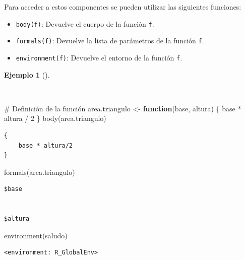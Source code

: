 \documentclass[
  spanish,
  a4paper,
]{scrreport}
\newenvironment{Shaded}{\begin{snugshade}}{\end{snugshade}}
\newcommand{\CommentTok}[1]{\textcolor[rgb]{0.37,0.37,0.37}{#1}}
\newcommand{\ControlFlowTok}[1]{\textcolor[rgb]{0.00,0.23,0.31}{\textbf{#1}}}
\newcommand{\DecValTok}[1]{\textcolor[rgb]{0.68,0.00,0.00}{#1}}
\newcommand{\FunctionTok}[1]{\textcolor[rgb]{0.28,0.35,0.67}{#1}}
\newcommand{\NormalTok}[1]{\textcolor[rgb]{0.00,0.23,0.31}{#1}}
\newcommand{\OtherTok}[1]{\textcolor[rgb]{0.00,0.23,0.31}{#1}}
\newcommand{\SpecialCharTok}[1]{\textcolor[rgb]{0.37,0.37,0.37}{#1}}
\providecommand{\tightlist}{%
  \setlength{\itemsep}{0pt}\setlength{\parskip}{0pt}}
\theoremstyle{definition}
\theoremstyle{definition}
\newtheorem{example}{Ejemplo}[chapter]
\theoremstyle{remark}
\begin{document}
Para acceder a estos componentes se pueden utilizar las siguientes
funciones:

\begin{itemize}
\tightlist
\item
  \texttt{body(f)}: Devuelve el cuerpo de la función \texttt{f}.
\item
  \texttt{formals(f)}: Devuelve la lista de parámetros de la función
  \texttt{f}.
\item
  \texttt{environment(f)}: Devuelve el entorno de la función \texttt{f}.
\end{itemize}

\begin{example}[]\protect\hypertarget{exm-componentes-funcion}{}\label{exm-componentes-funcion}

~

\begin{Shaded}
\begin{Highlighting}[]
\CommentTok{\# Definición de la función}
\NormalTok{area.triangulo }\OtherTok{\textless{}{-}} \ControlFlowTok{function}\NormalTok{(base, altura) \{}
\NormalTok{  base }\SpecialCharTok{*}\NormalTok{ altura }\SpecialCharTok{/} \DecValTok{2}
\NormalTok{\}}
\FunctionTok{body}\NormalTok{(area.triangulo)}
\end{Highlighting}
\end{Shaded}

\begin{verbatim}
{
    base * altura/2
}
\end{verbatim}

\begin{Shaded}
\begin{Highlighting}[]
\FunctionTok{formals}\NormalTok{(area.triangulo)}
\end{Highlighting}
\end{Shaded}

\begin{verbatim}
$base


$altura
\end{verbatim}

\begin{Shaded}
\begin{Highlighting}[]
\FunctionTok{environment}\NormalTok{(saludo)}
\end{Highlighting}
\end{Shaded}

\begin{verbatim}
<environment: R_GlobalEnv>
\end{verbatim}

\end{example}
\end{document}
